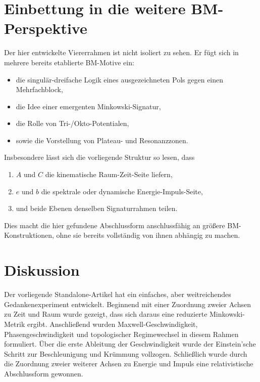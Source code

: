 \documentclass[11pt,a4paper]{article}
\theoremstyle{definition}
\theoremstyle{plain}
\begin{document}
	\section{Einbettung in die weitere BM-Perspektive}
	
	Der hier entwickelte Viererrahmen ist nicht isoliert zu sehen. Er fügt sich in mehrere bereits etablierte BM-Motive ein:
	\begin{itemize}[leftmargin=2em]
		\item die singulär-dreifache Logik eines ausgezeichneten Pols gegen einen Mehrfachblock,
		\item die Idee einer emergenten Minkowski-Signatur,
		\item die Rolle von Tri-/Okto-Potentialen,
		\item sowie die Vorstellung von Plateau- und Resonanzzonen.
	\end{itemize}
	
	Insbesondere lässt sich die vorliegende Struktur so lesen, dass
	\begin{enumerate}[leftmargin=2em]
		\item $A$ und $C$ die kinematische Raum-Zeit-Seite liefern,
		\item $e$ und $b$ die spektrale oder dynamische Energie-Impuls-Seite,
		\item und beide Ebenen denselben Signaturrahmen teilen.
	\end{enumerate}
	
	Dies macht die hier gefundene Abschlussform anschlussfähig an größere BM-Konstruktionen, ohne sie bereits vollständig von ihnen abhängig zu machen.
	
	\section{Diskussion}
	
	Der vorliegende Standalone-Artikel hat ein einfaches, aber weitreichendes Gedankenexperiment entwickelt. Beginnend mit einer Zuordnung zweier Achsen zu Zeit und Raum wurde gezeigt, dass sich daraus eine reduzierte Minkowski-Metrik ergibt. Anschließend wurden Maxwell-Geschwindigkeit, Phasengeschwindigkeit und topologischer Regimewechsel in diesem Rahmen formuliert. Über die erste Ableitung der Geschwindigkeit wurde der Einstein’sche Schritt zur Beschleunigung und Krümmung vollzogen. Schließlich wurde durch die Zuordnung zweier weiterer Achsen zu Energie und Impuls eine relativistische Abschlussform gewonnen.
	
\end{document}
